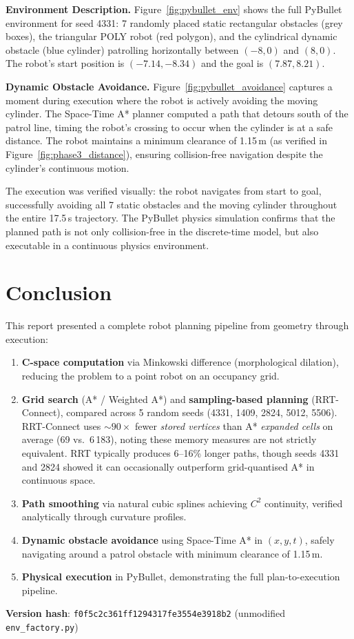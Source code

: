 \documentclass[11pt,a4paper]{article}
\begin{document}
\textbf{Environment Description.}
Figure~\ref{fig:pybullet_env} shows the full PyBullet environment for seed 4331: 7 randomly placed static rectangular obstacles (grey boxes), the triangular POLY robot (red polygon), and the cylindrical dynamic obstacle (blue cylinder) patrolling horizontally between $(-8, 0)$ and $(8, 0)$. The robot's start position is $(-7.14, -8.34)$ and the goal is $(7.87, 8.21)$.

\textbf{Dynamic Obstacle Avoidance.}
Figure~\ref{fig:pybullet_avoidance} captures a moment during execution where the robot is actively avoiding the moving cylinder. The Space-Time A* planner computed a path that detours south of the patrol line, timing the robot's crossing to occur when the cylinder is at a safe distance. The robot maintains a minimum clearance of 1.15\,m (as verified in Figure~\ref{fig:phase3_distance}), ensuring collision-free navigation despite the cylinder's continuous motion.

The execution was verified visually: the robot navigates from start to goal, successfully avoiding all 7 static obstacles and the moving cylinder throughout the entire 17.5\,s trajectory. The PyBullet physics simulation confirms that the planned path is not only collision-free in the discrete-time model, but also executable in a continuous physics environment.

\section{Conclusion}

This report presented a complete robot planning pipeline from geometry through execution:
\begin{enumerate}[nosep]
    \item \textbf{C-space computation} via Minkowski difference (morphological dilation), reducing the problem to a point robot on an occupancy grid.
    \item \textbf{Grid search} (A* / Weighted A*) and \textbf{sampling-based planning} (RRT-Connect), compared across 5 random seeds (4331, 1409, 2824, 5012, 5506). RRT-Connect uses ${\sim}90\times$ fewer \emph{stored vertices} than A* \emph{expanded cells} on average (69 vs.\ 6\,183), noting these memory measures are not strictly equivalent. RRT typically produces 6--16\% longer paths, though seeds 4331 and 2824 showed it can occasionally outperform grid-quantised A* in continuous space.
    \item \textbf{Path smoothing} via natural cubic splines achieving $C^2$ continuity, verified analytically through curvature profiles.
    \item \textbf{Dynamic obstacle avoidance} using Space-Time A* in $(x, y, t)$, safely navigating around a patrol obstacle with minimum clearance of 1.15\,m.
    \item \textbf{Physical execution} in PyBullet, demonstrating the full plan-to-execution pipeline.
\end{enumerate}

\vspace{0.5em}
\noindent\textbf{Version hash}: \texttt{f0f5c2c361ff1294317fe3554e3918b2} \quad (unmodified \texttt{env\_factory.py})
\end{document}

